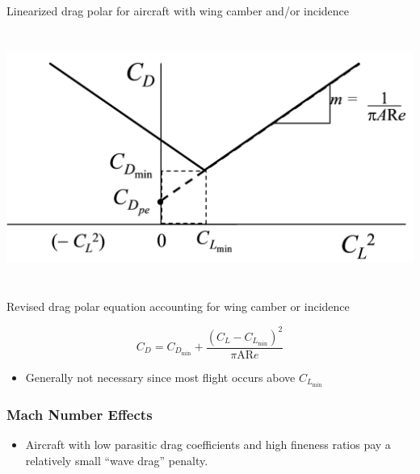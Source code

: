 \documentclass[
]{book}
\providecommand{\tightlist}{%
  \setlength{\itemsep}{0pt}\setlength{\parskip}{0pt}}
\begin{document}
Linearized drag polar for aircraft with wing camber and/or incidence

\includegraphics[width=6.325in,height=3.274in]{media/05/image81.svg}

Revised drag polar equation accounting for wing camber or incidence

\[C_D = C_{D_{\mathrm{min}}} + \frac{\left(C_L - C_{L_{\mathrm{min}}} \right)^2}{\pi \mathrm{AR} e} \]

\begin{itemize}
\tightlist
\item
  Generally not necessary since most flight occurs above \(C_{L_{\mathrm{min}}}\)
\end{itemize}

\hypertarget{mach-number-effects}{%
\subsubsection*{Mach Number Effects}\label{mach-number-effects}}

\begin{itemize}
\tightlist
\item
  Aircraft with low parasitic drag coefficients and high fineness ratios pay a relatively small ``wave drag'' penalty.
\end{itemize}
\end{document}
